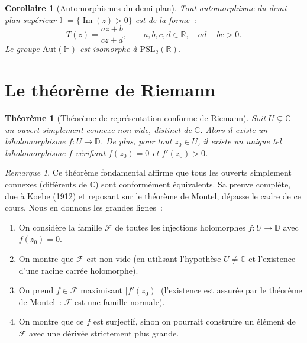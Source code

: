 \documentclass[12pt,a4paper,openany]{book}
\theoremstyle{definition}
\theoremstyle{plain}
\newtheorem{theoreme}[definition]{Théorème}
\newtheorem{corollaire}[definition]{Corollaire}
\theoremstyle{remark}
\newtheorem{remarque}[definition]{Remarque}
\newcommand{\C}{\mathbb{C}}
\newcommand{\R}{\mathbb{R}}
\newcommand{\D}{\mathbb{D}}
\DeclareMathOperator{\im}{Im}
\newcommand{\abs}[1]{\left|#1\right|}
\begin{document}
\begin{corollaire}[Automorphismes du demi-plan]\label{cor:auto-demiplan}
Tout automorphisme du demi-plan supérieur $\mathbb{H} = \{\im(z) > 0\}$
est de la forme~:
\[
  T(z) = \frac{az + b}{cz + d}, \qquad a,b,c,d \in \R, \quad ad - bc > 0.
\]
Le groupe $\mathrm{Aut}(\mathbb{H})$ est isomorphe à $\mathrm{PSL}_2(\R)$.
\end{corollaire}

\section{Le théorème de Riemann}\label{sec:riemann-mapping}

\begin{theoreme}[Théorème de représentation conforme de Riemann]\label{thm:riemann-mapping}
Soit $U \subsetneq \C$ un ouvert simplement connexe non vide, distinct de $\C$.
Alors il existe un biholomorphisme $f \colon U \to \D$. De plus, pour tout
$z_0 \in U$, il existe un unique tel biholomorphisme $f$ vérifiant
$f(z_0) = 0$ et $f'(z_0) > 0$.
\end{theoreme}

\begin{remarque}\label{rem:riemann-mapping}
Ce théorème fondamental affirme que tous les ouverts simplement connexes
(différents de $\C$) sont conformément équivalents. Sa preuve complète,
due à Koebe (1912) et reposant sur le théorème de Montel, dépasse le cadre
de ce cours. Nous en donnons les grandes lignes~:
\begin{enumerate}[label=\textbf{Étape \arabic*.}]
  \item On considère la famille $\mathcal{F}$ de toutes les injections
    holomorphes $f \colon U \to \D$ avec $f(z_0) = 0$.
  \item On montre que $\mathcal{F}$ est non vide (en utilisant l'hypothèse
    $U \neq \C$ et l'existence d'une racine carrée holomorphe).
  \item On prend $f \in \mathcal{F}$ maximisant $\abs{f'(z_0)}$ (l'existence
    est assurée par le théorème de Montel~: $\mathcal{F}$ est une famille
    normale).
  \item On montre que ce $f$ est surjectif, sinon on pourrait construire
    un élément de $\mathcal{F}$ avec une dérivée strictement plus grande.
\end{enumerate}
\end{remarque}
\end{document}

